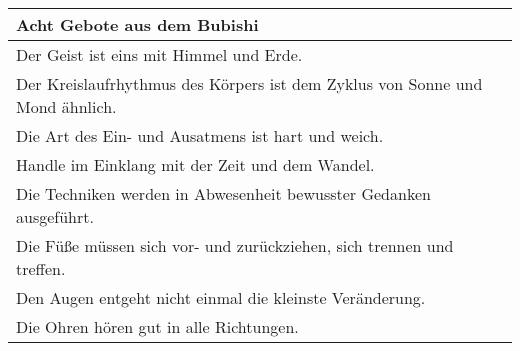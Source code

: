 \begin{tcolorbox}
\begin{footnotesize}
		\begin{tabularx}{\textwidth}{X}	
			\textbf{Acht Gebote aus dem Bubishi}\\
			\midrule
			Der Geist ist eins mit Himmel und Erde. \\
			Der Kreislaufrhythmus des Körpers ist dem Zyklus von Sonne und Mond ähnlich. \\
			Die Art des Ein- und Ausatmens ist hart und weich. \\
			Handle im Einklang mit der Zeit und dem Wandel. \\
			Die Techniken werden in Abwesenheit bewusster Gedanken ausgeführt. \\
			Die Füße müssen sich vor- und zurückziehen, sich trennen und treffen. \\
			Den Augen entgeht nicht einmal die kleinste Veränderung. \\
			Die Ohren hören gut in alle Richtungen. \\
		\end{tabularx}
	\end{footnotesize}
\end{tcolorbox}
\clearpage
\pagebreak
